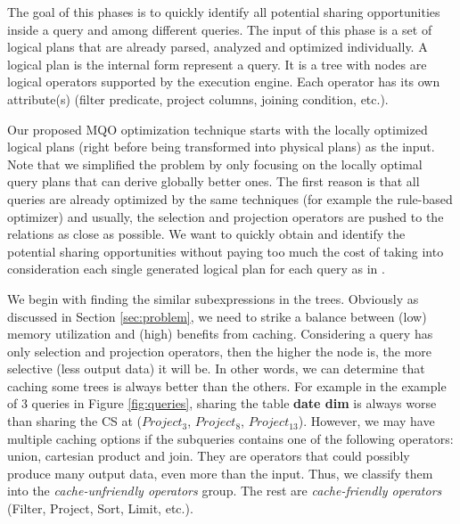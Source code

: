 The goal of this phases is to quickly identify all potential sharing opportunities inside a query and among different queries. The input of this phase is a set of logical plans that are already parsed, analyzed and optimized individually. A logical plan is the internal form represent a query. It is a tree with nodes are logical operators supported by the execution engine. Each operator has its own attribute(s) (filter predicate, project columns, joining condition, etc.). 

Our proposed MQO optimization technique starts with the locally optimized logical plans (right before being transformed into physical plans) as the input. Note that we simplified the problem by only focusing on the locally optimal query plans that can derive globally better ones. The first reason is that all queries are already optimized by the same techniques (for example the rule-based optimizer) and usually, the selection and projection operators are pushed to the relations as close as possible. We want to quickly obtain and identify the potential sharing opportunities without paying too much the cost of taking into consideration each single generated logical plan for each query as in \cite{zhou2007efficient}.

We begin with finding the similar subexpressions in the trees. Obviously as discussed in Section \ref{sec:problem}, we need to strike a balance between (low) memory utilization and (high) benefits from caching. Considering a query has only selection and projection operators, then the higher the node is, the more selective (less output data) it will be. In other words, we can determine that caching some trees is always better than the others. For example in the example of 3 queries in Figure \ref{fig:queries}, sharing the table \textbf{date dim} is always worse than sharing the CS at ($Project_3$, $Project_8$, $Project_{13}$). However, we may have multiple caching options if the subqueries contains one of the following operators: union, cartesian product and join. They are operators that could possibly produce many output data, even more than the input. Thus, we classify them into the \emph{cache-unfriendly operators} group. The rest are \emph{cache-friendly operators} (Filter, Project, Sort, Limit, etc.).


